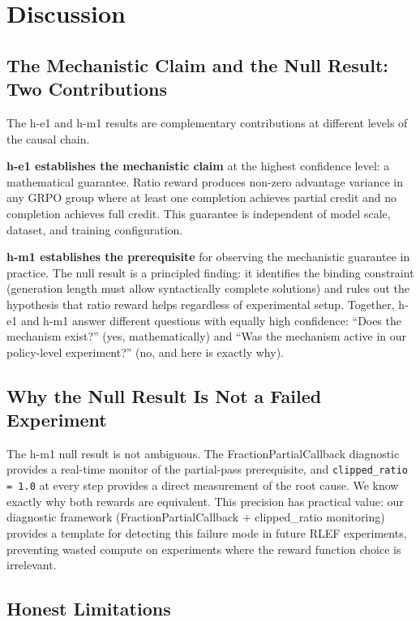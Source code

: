 \section{Discussion}
\label{sec:discussion}

\subsection{The Mechanistic Claim and the Null Result: Two Contributions}

The h-e1 and h-m1 results are complementary contributions at different levels of the causal chain.

\textbf{h-e1 establishes the mechanistic claim} at the highest confidence level: a mathematical guarantee. Ratio reward produces non-zero advantage variance in any GRPO group where at least one completion achieves partial credit and no completion achieves full credit. This guarantee is independent of model scale, dataset, and training configuration.

\textbf{h-m1 establishes the prerequisite} for observing the mechanistic guarantee in practice. The null result is a principled finding: it identifies the binding constraint (generation length must allow syntactically complete solutions) and rules out the hypothesis that ratio reward helps regardless of experimental setup. Together, h-e1 and h-m1 answer different questions with equally high confidence: ``Does the mechanism exist?'' (yes, mathematically) and ``Was the mechanism active in our policy-level experiment?'' (no, and here is exactly why).

\subsection{Why the Null Result Is Not a Failed Experiment}

The h-m1 null result is not ambiguous. The FractionPartialCallback diagnostic provides a real-time monitor of the partial-pass prerequisite, and \texttt{clipped\_ratio = 1.0} at every step provides a direct measurement of the root cause. We know exactly why both rewards are equivalent. This precision has practical value: our diagnostic framework (FractionPartialCallback + clipped\_ratio monitoring) provides a template for detecting this failure mode in future RLEF experiments, preventing wasted compute on experiments where the reward function choice is irrelevant.

\subsection{Honest Limitations}

